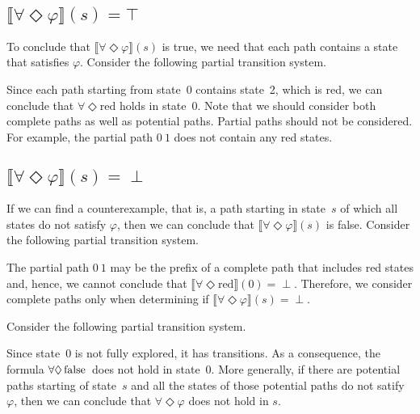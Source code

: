 \documentclass[12pt]{article}
\newcommand{\eventually}{\Diamond}
\newcommand{\FALSE}{\mbox{\lstinline{false}}}
\theoremstyle{definition}
\newcommand{\satisfaction}[1]{\llbracket #1 \rrbracket}
\begin{document}
\subsection*{$\satisfaction{\forall \eventually \varphi}(s) = \top$}

To conclude that $\satisfaction{\forall \eventually \varphi}(s)$ is true, we need that each path contains a state that satisfies $\varphi$.  Consider the following partial transition system.
\begin{center}
\end{center}
Since each path starting from state~0 contains state~2, which is red, we can conclude that $\forall \eventually \mbox{red}$ holds in state~0.  Note that we should consider both complete paths as well as potential paths.  Partial paths should not be considered.  For example, the partial path $0\ 1$ does not contain any red states.

\subsection*{$\satisfaction{\forall \eventually \varphi}(s) = \perp$}

If we can find a counterexample, that is, a path starting in state~$s$ of which all states do not satisfy $\varphi$, then we can conclude that $\satisfaction{\forall \eventually \varphi}(s)$ is false.  Consider the following partial transition system.
\begin{center}
\end{center}
The partial path $0\ 1$ may be the prefix of a complete path that includes red states and, hence, we cannot conclude that $\satisfaction{\forall \eventually \mbox{red}}(0) = \perp$.  Therefore, we consider complete paths only when determining if $\satisfaction{\forall \eventually \varphi}(s) = \perp$.

Consider the following partial transition system.
\begin{center}
\end{center}
Since state~0 is not fully explored, it has transitions.  As a consequence, the formula $\forall \eventually \FALSE$ does not hold in state~0.  More generally, if there are potential paths starting of state~$s$ and all the states of those potential paths do not satify $\varphi$, then we can conclude that $\forall \eventually \varphi$ does not hold in $s$.
\end{document}
